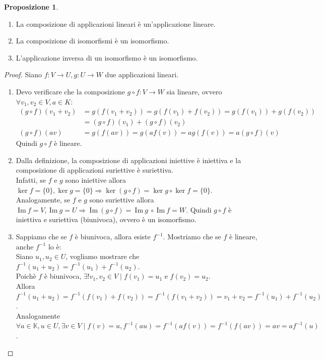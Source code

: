 \documentclass[a4paper]{article}
\newcommand{\IM}{\ \mathrm{Im} \ }
\theoremstyle{definition}
\newtheorem*{prop}{Proposizione}
\begin{document}
\begin{prop}
	\begin{enumerate}
		\item La composizione di applicazioni lineari è un'applicazione lineare.
		\item La composizione di isomorfismi è un isomorfismo.
		\item L'applicazione inversa di un isomorfismo è un isomorfismo.
	\end{enumerate}
\end{prop}
\begin{proof}
	Siano $f: V \rightarrow U, g: U \rightarrow W$ due applicazioni lineari.
	\begin{enumerate}
		\item Devo verificare che la composizione $g \circ f: V \rightarrow W$ sia lineare, ovvero $\forall v_1, v_2 \in V, a \in K$:
		      \begin{align*}
			      (g \circ f)(v_1 + v_2) & = g(f(v_1 + v_2)) = g(f(v_1) + f(v_2)) = g(f(v_1)) + g(f(v_2)) \\
				  						 & = (g \circ f)(v_1) + (g \circ f)(v_2) \\
			      (g \circ f)(av)        & = g(f(av)) = g(af(v)) = ag(f(v)) = a(g \circ f)(v)
		      \end{align*}
			  Quindi $g \circ f$ è lineare.
		\item Dalla definizione, la composizione di applicazioni iniettive è iniettiva e la composizione di applicazioni suriettive è suriettiva. \\
		      Infatti, se $f$ e $g$ sono iniettive allora $\ker f = \{0\}, \ker g = \{0\} \Rightarrow \ker(g \circ f) = \ker g \circ \ker f = \{0\}$. \\
			  Analogamente, se $f$ e $g$ sono suriettive allora $\IM f = V, \IM g = U \Rightarrow \IM(g \circ f) = \IM g \ \circ \IM f = W$.
			  Quindi $g \circ f$ è iniettiva e suriettiva (biunivoca), ovvero è un isomorfismo.
		\item Sappiamo che se $f$ è biunivoca, allora esiste $f^{-1}$. Mostriamo che se $f$ è lineare, anche $f^{-1}$ lo è: \\
			  Siano $u_1, u_2 \in U$, vogliamo mostrare che $f^{-1}(u_1 + u_2) = f^{-1}(u_1) + f^{-1}(u_2)$. \\
			  Poichè $f$ è biunivoca, $\exists! v_1, v_2 \in V \mid f(v_1) = u_1$ e $f(v_2) = u_2$. \\
			  Allora $f^{-1}(u_1 + u_2) = f^{-1}(f(v_1) + f(v_2)) = f^{-1}(f(v_1 + v_2)) = v_1 + v_2 = f^{-1}(u_1) + f^{-1}(u_2)$. \\
			  Analogamente $\forall a \in \mathbb{K}, u \in U, \exists v \in V \mid f(v) = u, f^{-1}(au) = f^{-1}(af(v)) = f^{-1}(f(av)) = av = af^{-1}(u)$.
	\end{enumerate}
	\begin{center}


\end{center}
\end{proof}
\end{document}
